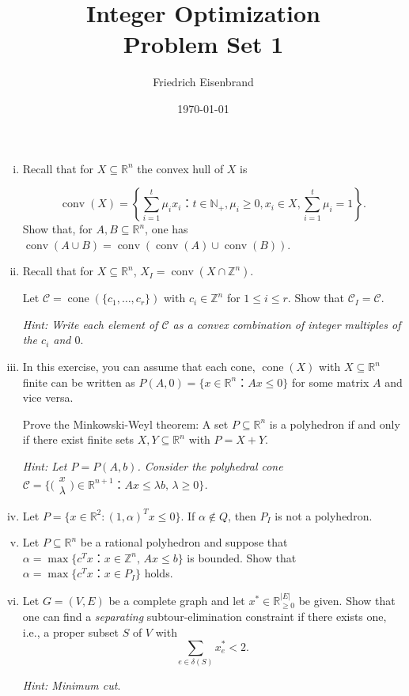 \documentclass[11pt,a4paper]{article}
\title{Integer Optimization  \\ Problem Set 1 }
\author{ Friedrich Eisenbrand}
\date{\today}
\newcommand{\smat}[1]{ \big(\begin{smallmatrix} #1 \end{smallmatrix}\big)}
\DeclareMathOperator{\conv}{conv}
\DeclareMathOperator{\cone}{cone}
\begin{document}
\maketitle 




\begin{enumerate}[i)] 
\item Recall that for $X ⊆ ℝ^n$ the convex hull of $X$ is

  \begin{displaymath}
      \conv(X) = \left\{ ∑_{i=1}^t μ_i x_i ： t ∈ ℕ_+, μ_i ≥0, x_i ∈ X, ∑_{i=1}^t μ_i =1 \right\}.
  \end{displaymath}
Show that, for $A,B ⊆ ℝ^n$, one has $\conv(A ∪B) = \conv\left( \conv(A) ∪ \conv(B) \right)$.  

\item

  Recall that for $X ⊆ ℝ^n$, $X_I = \conv( X ∩ ℤ^n)$. 
  
  Let $\mathscr{C} = \cone(\{c_1,\dots,c_r\})$ with $c_i ∈ℤ^n$ for $1≤i≤r$. Show that $\mathscr{C}_I = \mathscr{C}$.

  \emph{Hint: Write each element of $\mathscr{C}$ as a convex combination of integer multiples of the $c_i$ and $0$}.

\item In this exercise, you can assume that each cone, $\cone (X)$ with $X ⊆ℝ^n$ finite can be written as $P(A,0) = \{ x ∈ℝ^n ： Ax≤0\}$ for some matrix $A$ and vice versa.

  Prove the Minkowski-Weyl theorem: A set $P ⊆ ℝ^n$ is a polyhedron if and only if there exist finite sets $X,Y ⊆ ℝ^n$ with $P = X+Y$.

  \emph{Hint: Let $P = P(A,b)$. Consider the polyhedral cone $\mathscr{C} = \{ \smat{x\\λ} ∈ℝ^{n+1}  ：Ax ≤ λb, \, λ≥0 \}$. }

\item Let $P = \{ x ∈ ℝ^2 : (1,α)^T x ≤ 0\}$. If $α ∉ Q$, then $P_I$ is not a polyhedron.

\item Let $P ⊆ ℝ^n$ be a rational polyhedron and suppose that $α = \max\{ c^Tx ：x∈ℤ^n, \, Ax≤ b\}$ is bounded. Show that $α =  \max\{ c^Tx ：x ∈ P_I\}$ holds.


\item Let $G = (V,E)$ be a complete graph and let $x^* ∈ ℝ^{|E|}_{≥0}$  be given. Show that one can find a \emph{separating} subtour-elimination constraint if there exists one, i.e., a proper  subset $S$ of $V$ with
  \begin{displaymath}
    ∑_{e ∈ δ(S)} x^*_e <2. 
  \end{displaymath}

  \emph{Hint: Minimum cut}. 
  
\end{enumerate}



%
%


 
\end{document}
